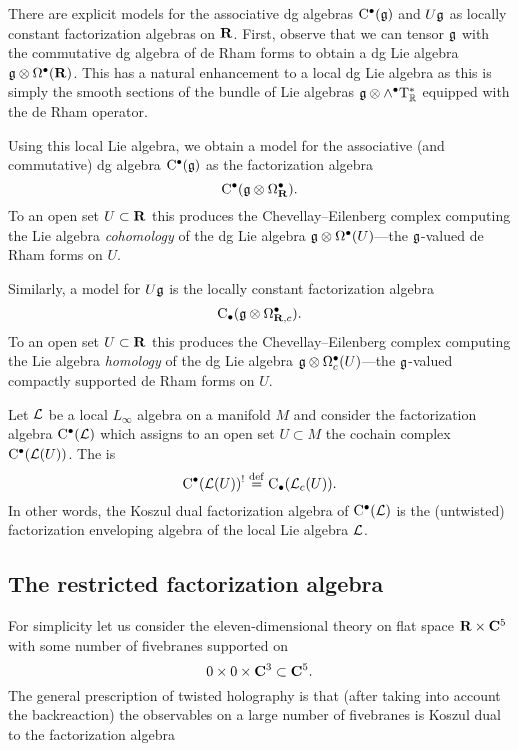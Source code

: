 \documentclass[11pt]{amsart}
\begin{document}
There are explicit models for the associative dg algebras ${\rm C}^\bullet(\mathfrak{g})$ and $U \mathfrak{g}$ as locally constant factorization algebras on $\mathbf{R}$.
First, observe that we can tensor $\mathfrak g$ with the commutative dg algebra of de Rham forms to obtain a dg Lie algebra $\mathfrak g \otimes \Omega^\bullet(\mathbf{R})$. 
This has a natural enhancement to a local dg Lie algebra as this is simply the smooth sections of the bundle of Lie algebras $\mathfrak g \otimes \wedge^\bullet {\rm T}^*_\mathbb R$ equipped with the de Rham operator.

Using this local Lie algebra, we obtain a model for the associative (and commutative) dg algebra ${\rm C}^\bullet(\mathfrak g)$ as the factorization algebra
\[
{\rm C}^\bullet(\mathfrak g \otimes \Omega^\bullet_{\mathbf{R}}).
\]
To an open set $U \subset \mathbf{R}$ this produces the Chevellay--Eilenberg complex computing the Lie algebra {\em cohomology} of the dg Lie algebra $\mathfrak g \otimes \Omega^\bullet(U)$---the $\mathfrak g$-valued de Rham forms on $U$.
 
Similarly, a model for $U \mathfrak g$ is the locally constant factorization algebra
\[
{\rm C}_\bullet(\mathfrak g \otimes \Omega^\bullet_{\mathbf{R},c}).
\]
To an open set $U \subset \mathbf{R}$ this produces the Chevellay--Eilenberg complex computing the Lie algebra {\em homology} of the dg Lie algebra $\mathfrak g \otimes \Omega^\bullet_c(U)$---the $\mathfrak g$-valued compactly supported de Rham forms on $U$.

\parsec[s:generalkoszul]

\begin{dfn}
Let $\mathcal L$ be a local $L_\infty$ algebra on a manifold $M$ and consider the factorization algebra ${\rm C}^\bullet(\mathcal L)$ which assigns to an open set $U \subset M$ the cochain complex ${\rm C}^\bullet(\mathcal L(U))$. 
The  is 
\[
{\rm C}^\bullet(\mathcal L(U))^! \overset{\rm def}{=} {\rm C}_\bullet (\mathcal L_{c}(U)) .
\]
In other words, the Koszul dual factorization algebra of ${\rm C}^\bullet(\mathcal L)$ is the (untwisted) factorization enveloping algebra of the local Lie algebra $\mathcal L$. 
\end{dfn} 

\subsection{The restricted factorization algebra}

For simplicity let us consider the eleven-dimensional theory on flat space $\mathbf{R} \times \mathbf{C}^5$ with some number of fivebranes supported on
\[
0 \times 0 \times \mathbf{C}^3 \subset \mathbf{C}^5 .
\]
The general prescription of twisted holography is that (after taking into account the backreaction) the observables on a large number of fivebranes is Koszul dual to the factorization algebra 
\end{document}
